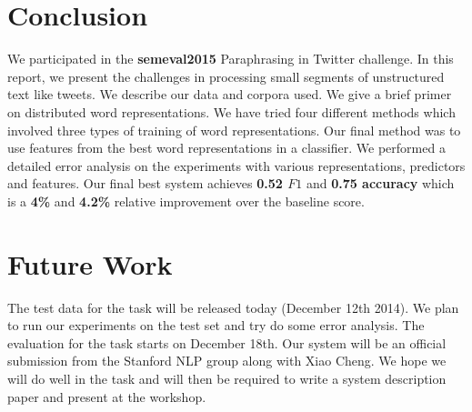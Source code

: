 \documentclass[conference]{IEEEtran}
\begin{document}
\section{Conclusion}
We participated in the \textbf{semeval2015} Paraphrasing in Twitter challenge. In this report, we present the challenges in processing small segments of unstructured text like tweets. We describe our data and corpora used. We give a brief primer on distributed word representations. We have tried four different methods which involved three types of training of word representations. Our final method was to use features from the best word representations in a classifier. We performed a detailed error analysis on the experiments with various representations, predictors and features. Our final best system achieves \textbf{0.52 $F1$} and \textbf{0.75 accuracy} which is a \textbf{4\%} and  \textbf{4.2\%} relative improvement over the baseline score.

\section{Future Work}
The test data for the task will be released today (December 12th 2014). We plan to run our experiments on the test set and try do some error analysis. The evaluation for the task starts on December 18th. Our system will be an official submission from the Stanford NLP group along with Xiao Cheng. We hope we will do well in the task and will then be required to write a system description paper and present at the workshop.\\


\end{document}
